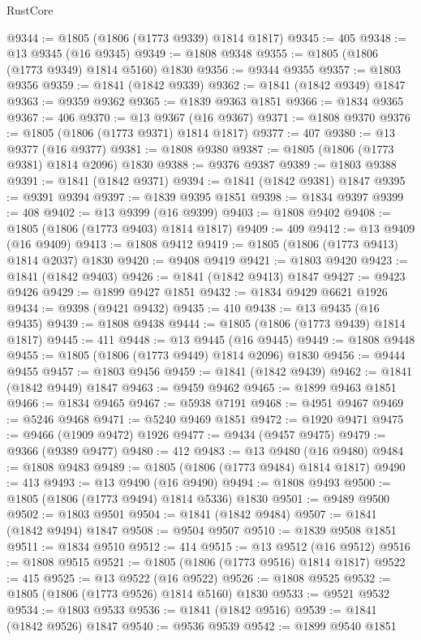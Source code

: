 \begin{lexlean}{RustCore}
\begin{coremodule}
@9344 := @1805 (@1806 (@1773 @9339) @1814 @1817)
@9345 := 405
@9348 := @13 @9345 (@16 @9345)
@9349 := @1808 @9348
@9355 := @1805 (@1806 (@1773 @9349) @1814 @5160) @1830
@9356 := @9344 @9355
@9357 := @1803 @9356
@9359 := @1841 (@1842 @9339)
@9362 := @1841 (@1842 @9349) @1847
@9363 := @9359 @9362
@9365 := @1839 @9363 @1851
@9366 := @1834 @9365
@9367 := 406
@9370 := @13 @9367 (@16 @9367)
@9371 := @1808 @9370
@9376 := @1805 (@1806 (@1773 @9371) @1814 @1817)
@9377 := 407
@9380 := @13 @9377 (@16 @9377)
@9381 := @1808 @9380
@9387 := @1805 (@1806 (@1773 @9381) @1814 @2096) @1830
@9388 := @9376 @9387
@9389 := @1803 @9388
@9391 := @1841 (@1842 @9371)
@9394 := @1841 (@1842 @9381) @1847
@9395 := @9391 @9394
@9397 := @1839 @9395 @1851
@9398 := @1834 @9397
@9399 := 408
@9402 := @13 @9399 (@16 @9399)
@9403 := @1808 @9402
@9408 := @1805 (@1806 (@1773 @9403) @1814 @1817)
@9409 := 409
@9412 := @13 @9409 (@16 @9409)
@9413 := @1808 @9412
@9419 := @1805 (@1806 (@1773 @9413) @1814 @2037) @1830
@9420 := @9408 @9419
@9421 := @1803 @9420
@9423 := @1841 (@1842 @9403)
@9426 := @1841 (@1842 @9413) @1847
@9427 := @9423 @9426
@9429 := @1899 @9427 @1851
@9432 := @1834 @9429 @6621 @1926
@9434 := @9398 (@9421 @9432)
@9435 := 410
@9438 := @13 @9435 (@16 @9435)
@9439 := @1808 @9438
@9444 := @1805 (@1806 (@1773 @9439) @1814 @1817)
@9445 := 411
@9448 := @13 @9445 (@16 @9445)
@9449 := @1808 @9448
@9455 := @1805 (@1806 (@1773 @9449) @1814 @2096) @1830
@9456 := @9444 @9455
@9457 := @1803 @9456
@9459 := @1841 (@1842 @9439)
@9462 := @1841 (@1842 @9449) @1847
@9463 := @9459 @9462
@9465 := @1899 @9463 @1851
@9466 := @1834 @9465
@9467 := @5938 @7191
@9468 := @4951 @9467
@9469 := @5246 @9468
@9471 := @5240 @9469 @1851
@9472 := @1920 @9471
@9475 := @9466 (@1909 @9472) @1926
@9477 := @9434 (@9457 @9475)
@9479 := @9366 (@9389 @9477)
@9480 := 412
@9483 := @13 @9480 (@16 @9480)
@9484 := @1808 @9483
@9489 := @1805 (@1806 (@1773 @9484) @1814 @1817)
@9490 := 413
@9493 := @13 @9490 (@16 @9490)
@9494 := @1808 @9493
@9500 := @1805 (@1806 (@1773 @9494) @1814 @5336) @1830
@9501 := @9489 @9500
@9502 := @1803 @9501
@9504 := @1841 (@1842 @9484)
@9507 := @1841 (@1842 @9494) @1847
@9508 := @9504 @9507
@9510 := @1839 @9508 @1851
@9511 := @1834 @9510
@9512 := 414
@9515 := @13 @9512 (@16 @9512)
@9516 := @1808 @9515
@9521 := @1805 (@1806 (@1773 @9516) @1814 @1817)
@9522 := 415
@9525 := @13 @9522 (@16 @9522)
@9526 := @1808 @9525
@9532 := @1805 (@1806 (@1773 @9526) @1814 @5160) @1830
@9533 := @9521 @9532
@9534 := @1803 @9533
@9536 := @1841 (@1842 @9516)
@9539 := @1841 (@1842 @9526) @1847
@9540 := @9536 @9539
@9542 := @1899 @9540 @1851

\end{coremodule}
\end{lexlean}
